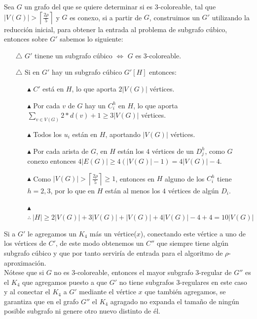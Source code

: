 \documentclass{article}
\begin{document}
Sea $G$ un grafo del que se quiere determinar si es $3$-coloreable, tal que $|V(G)| >  \left\lceil\frac{2\rho}{5} \right\rceil $ y $G$ es conexo, si a partir de $G$, construimos un $G'$ utilizando la 
reducci\'on inicial, para obtener la entrada al problema de subgrafo c\'ubico, entonces sobre $G'$ sabemos lo siguiente: 

\begin{itemize}
    \item[$\triangle $] $G'$ tinene un subgrafo c\'ubico $\Leftrightarrow $ $G$ es $3$-coloreable.
    \item[$\triangle $] Si en $G'$ hay un subgrafo c\'ubico $G'[H]$ entonces: 
    \begin{itemize}
        \item[$\blacktriangle $] $C'$ est\'a en $H$, lo que aporta $2|V(G)|$ v\'ertices.
        \item[$\blacktriangle $] Por cada $v$ de $G$ hay un $C_i^h$ en $H$, lo que aporta $\sum_{v \in V(G)} 2*d(v) + 1 \geq 3|V(G)|$ v\'ertices.
        \item[$\blacktriangle $] Todos los $u_i$ est\'an en $H$, aportando $|V(G)|$ v\'ertices.
        \item[$\blacktriangle $] Por cada arista de $G$, en $H$ est\'an los $4$ v\'ertices de un $D_j^h$, como $G$ conexo entonces $4|E(G)| \geq 4(|V(G)| - 1) = 4|V(G)|-4$.
        \item[$\blacktriangle $] Como $|V(G)| > \left\lceil \frac{2 \rho}{5} \right\rceil \geq 1 $, entonces en $H$ alguno de los $C_i^h$ tiene $h =2,3$, por lo que en $H$ est\'an al menos los $4$ v\'ertices de alg\'un $D_i$.
        \item[$\blacktriangle $] $\therefore~ |H| \geq 2|V(G)| + 3|V(G)| + |V(G)| + 4|V(G)|-4 +4 = 10|V(G)|$
    \end{itemize}
\end{itemize}
Si a $G'$ le agregamos un $K_4$ m\'as un v\'ertice($x$), conectando este v\'ertice a uno de los v\'ertices de $C'$, de este modo obtenemos un $C''$ que siempre tiene alg\'un subgrafo c\'ubico y que por tanto 
servir\'ia de entrada para el algoritmo de $\rho$-aproximaci\'on. \\

N\'otese que si $G$ no es $3$-coloreable, entonces el mayor subgrafo $3$-regular de $G''$ es el $K_4$ que agregamos puesto a que $G'$ no tiene 
subgrafos $3$-regulares en este caso y al conectar el $K_4$ a $G'$ mediante el v\'ertice $x$ que tambi\'en agregamos, se garantiza que en el grafo $G''$ el $K_4$
agragado no expanda el tama\~no de ning\'un posible subgrafo ni genere otro nuevo distinto de \'el.\\ 
\end{document}
